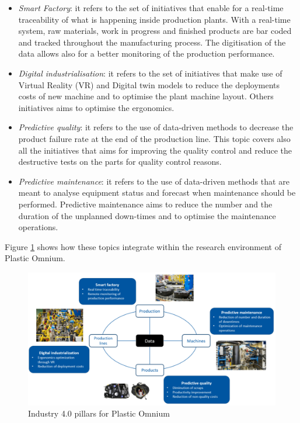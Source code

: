\begin{itemize}
    \item \textit{Smart Factory}: it refers to the set of initiatives that enable for a real-time traceability of what is happening inside production plants. With a real-time system, raw materials, work in progress and finished products are bar coded and tracked throughout the manufacturing process. The digitisation of the data allows also for a better monitoring of the production performance.
    \item \textit{Digital industrialisation}: it refers to the set of initiatives that make use of Virtual Reality (VR) and Digital twin models to reduce the deployments costs of new machine and to optimise the plant machine layout. Others initiatives aims to optimise the ergonomics. 
    \item \textit{Predictive quality}: it refers to the use of data-driven methods to decrease the product failure rate at the end of the production line. This topic covers also all the initiatives that aims for improving the quality control and reduce the destructive tests on the parts for quality control reasons.  
    \item \textit{Predictive maintenance}: it refers to the use of data-driven methods that are meant to analyse equipment status and forecast when maintenance should be performed. Predictive maintenance aims to reduce the number and the duration of the unplanned down-times and to optimise the maintenance operations.
\end{itemize}
%
Figure \ref{fig:pillars} shows how these topics integrate within the research environment of Plastic Omnium.
%
\begin{figure}
\centerline{\includegraphics[scale=0.50]{images/chapter_1/Digitalisation_pillars.png}}
\caption{Industry 4.0 pillars for Plastic Omnium}
\label{fig:pillars}
\end{figure}
